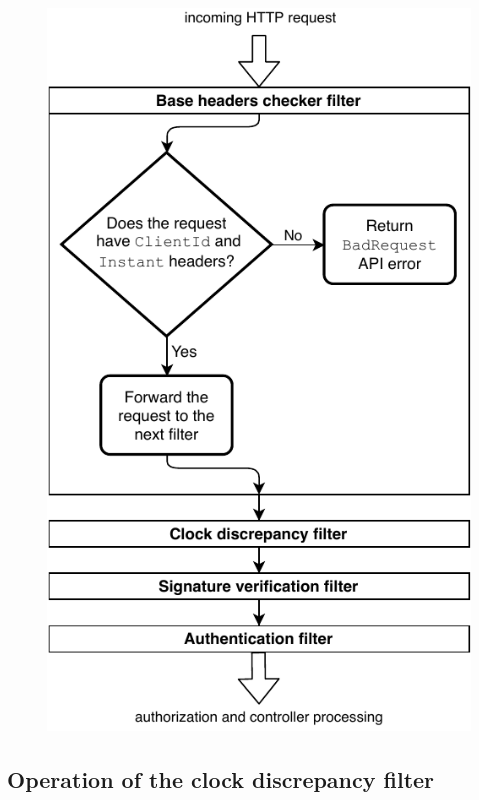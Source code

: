 \begin{figure}[!htb]
    \centering
    \includegraphics[height=\textheight-1cm]{figures/base-headers-checker-filter.pdf}
\end{figure}

\newpage

\subsection{Operation of the clock discrepancy filter}

